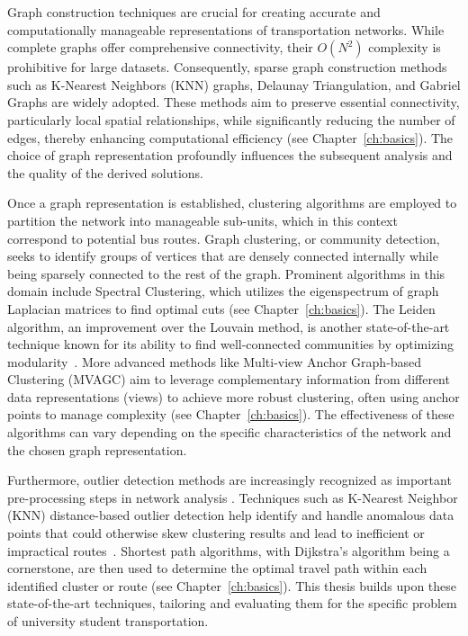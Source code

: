 Graph construction techniques are crucial for creating accurate and computationally manageable representations of transportation networks. While complete graphs offer comprehensive connectivity, their $O(N^2)$ complexity is prohibitive for large datasets. Consequently, sparse graph construction methods such as K-Nearest Neighbors (KNN) graphs, Delaunay Triangulation, and Gabriel Graphs are widely adopted. These methods aim to preserve essential connectivity, particularly local spatial relationships, while significantly reducing the number of edges, thereby enhancing computational efficiency (see Chapter~\ref{ch:basics}). The choice of graph representation profoundly influences the subsequent analysis and the quality of the derived solutions.

Once a graph representation is established, clustering algorithms are employed to partition the network into manageable sub-units, which in this context correspond to potential bus routes. Graph clustering, or community detection, seeks to identify groups of vertices that are densely connected internally while being sparsely connected to the rest of the graph. Prominent algorithms in this domain include Spectral Clustering, which utilizes the eigenspectrum of graph Laplacian matrices to find optimal cuts (see Chapter~\ref{ch:basics}). The Leiden algorithm, an improvement over the Louvain method, is another state-of-the-art technique known for its ability to find well-connected communities by optimizing modularity~\cite{leiden}. More advanced methods like Multi-view Anchor Graph-based Clustering (MVAGC) aim to leverage complementary information from different data representations (views) to achieve more robust clustering, often using anchor points to manage complexity (see Chapter~\ref{ch:basics}). The effectiveness of these algorithms can vary depending on the specific characteristics of the network and the chosen graph representation.

Furthermore, outlier detection methods are increasingly recognized as important pre-processing steps in network analysis \cite{lu2020outlier}. Techniques such as K-Nearest Neighbor (KNN) distance-based outlier detection help identify and handle anomalous data points that could otherwise skew clustering results and lead to inefficient or impractical routes~\cite{knn_outlier}. Shortest path algorithms, with Dijkstra's algorithm being a cornerstone, are then used to determine the optimal travel path within each identified cluster or route (see Chapter~\ref{ch:basics}). This thesis builds upon these state-of-the-art techniques, tailoring and evaluating them for the specific problem of university student transportation.

